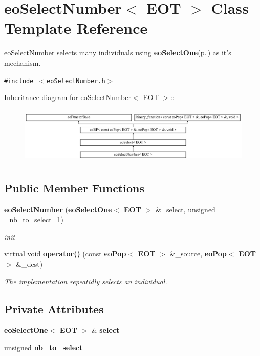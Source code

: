 \section{eo\-Select\-Number$<$ EOT $>$ Class Template Reference}
\label{classeo_select_number}
eo\-Select\-Number selects many individuals using {\bf eo\-Select\-One}{\rm (p.\,\pageref{classeo_select_one})} as it's mechanism.  


{\tt \#include $<$eo\-Select\-Number.h$>$}

Inheritance diagram for eo\-Select\-Number$<$ EOT $>$::\begin{figure}[H]
\begin{center}
\leavevmode
\includegraphics[height=2.75184cm]{classeo_select_number}
\end{center}
\end{figure}
\subsection*{Public Member Functions}
\begin{CompactItemize}
\item 
{\bf eo\-Select\-Number} ({\bf eo\-Select\-One}$<$ {\bf EOT} $>$ \&\_\-select, unsigned \_\-nb\_\-to\_\-select=1)\label{classeo_select_number_a0}

\begin{CompactList}\small\item\em init \item\end{CompactList}\item 
virtual void {\bf operator()} (const {\bf eo\-Pop}$<$ {\bf EOT} $>$ \&\_\-source, {\bf eo\-Pop}$<$ {\bf EOT} $>$ \&\_\-dest)
\begin{CompactList}\small\item\em The implementation repeatidly selects an individual. \item\end{CompactList}\end{CompactItemize}
\subsection*{Private Attributes}
\begin{CompactItemize}
\item 
{\bf eo\-Select\-One}$<$ {\bf EOT} $>$ \& {\bf select}\label{classeo_select_number_r0}

\item 
unsigned {\bf nb\_\-to\_\-select}\label{classeo_select_number_r1}

\end{CompactItemize}


